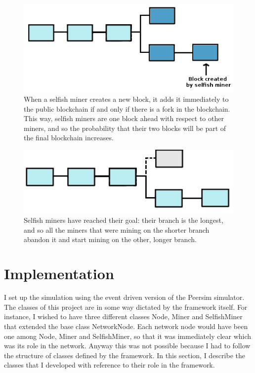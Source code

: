 \documentclass{article}
\begin{document}
\begin{figure}
\centerline{\includegraphics[scale=0.41]{fork_2b}}
\caption{When a selfish miner creates a new block, it adds it immediately to the public blockchain if and only if there is a fork in the blockchain. This way, selfish miners are one block ahead with respect to other miners, and so the probability that their two blocks will be part of the final blockchain increases.}
\label{fig:fork_2b}
\end{figure}

\begin{figure}
\centerline{\includegraphics[scale=0.41]{fork_resolved}}
\caption{Selfish miners have reached their goal: their branch is the longest, and so all the miners that were mining on the shorter branch abandon it and start mining on the other, longer branch.}
\label{fig:fork_resolved}
\end{figure}


\section{Implementation}  
I set up the simulation using the event driven version of the Peersim simulator. The classes of this project are in some way dictated by the framework itself. For instance, I wished to have three different classes Node, Miner and SelfishMiner that extended the base class NetworkNode. Each network node would have been one among Node, Miner and SelfishMiner, so that it was immediately clear which was its role in the network. Anyway this was not possible because I had to follow the structure of classes defined by the framework. In this section, I describe the classes that I developed with reference to their role in the framework.
\end{document}
